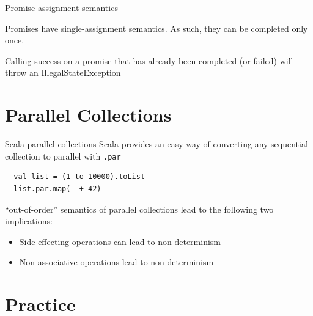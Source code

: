 \documentclass[aspectratio=169]{beamer}
\begin{document}
\begin{frame}{Promise assignment semantics}
      \begin{block}{}
        Promises have single-assignment semantics. As such, they can be completed only once. 
      \end{block}
      \bigskip
      Calling success on a promise that has already been completed (or failed) will throw an
      IllegalStateException
\end{frame}


\section{Parallel Collections}

\begin{frame}[fragile]{Scala parallel collections}
  Scala provides an easy way of converting any sequential collection to parallel with \texttt{.par}
  \bigskip
  \pause
  \begin{verbatim}
  val list = (1 to 10000).toList
  list.par.map(_ + 42)
  \end{verbatim}
  \bigskip
  “out-of-order” semantics of parallel collections lead to the following two implications:
  \begin{itemize}
    \item Side-effecting operations can lead to non-determinism
    \item Non-associative operations lead to non-determinism
  \end{itemize}
\end{frame}


\section{Practice}
\end{document}
